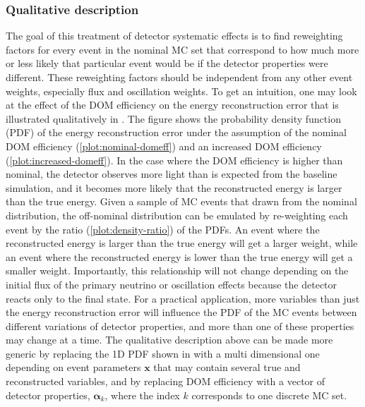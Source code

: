 \subsubsection{Qualitative description}
The goal of this treatment of detector systematic effects is to find reweighting factors for every event in the nominal MC set that correspond to how much more or less likely that particular event would be if the detector properties were different.
These reweighting factors should be independent from any other event weights, especially flux and oscillation weights.
To get an intuition, one may look at the effect of the DOM efficiency on the energy reconstruction error that is illustrated qualitatively in .
The figure shows the probability density function (PDF) of the energy reconstruction error under the assumption of the nominal DOM efficiency (\ref{plot:nominal-domeff}) and an increased DOM efficiency (\ref{plot:increased-domeff}).
In the case where the DOM efficiency is higher than nominal, the detector observes more light than is expected from the baseline simulation, and it becomes more likely that the reconstructed energy is larger than the true energy.
Given a sample of MC events that drawn from the nominal distribution, the off-nominal distribution can be emulated by re-weighting each event by the ratio (\ref{plot:density-ratio}) of the PDFs.
An event where the reconstructed energy is larger than the true energy will get a larger weight, while an event where the reconstructed energy is lower than the true energy will get a smaller weight.
Importantly, this relationship will not change depending on the initial flux of the primary neutrino or oscillation effects because the detector reacts only to the final state.
For a practical application, more variables than just the energy reconstruction error will influence the PDF of the MC events between different variations of detector properties, and more than one of these properties may change at a time.
The qualitative description above can be made more generic by replacing the 1D PDF shown in  with a multi dimensional one depending on event parameters $\boldsymbol{x}$ that may contain several true and reconstructed variables, and by replacing DOM efficiency with a vector of detector properties, $\boldsymbol{\alpha}_k$, where the index $k$ corresponds to one discrete MC set.

